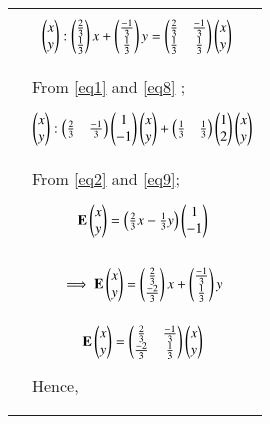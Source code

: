 \documentclass[journal,12pt]{IEEEtran}
\begin{document}
\begin{longtable}{|p{4cm}|p{14cm}|}
      &{\begin{align}\label{eq8}
      & \begin{pmatrix}x\\y\end{pmatrix}: \begin{pmatrix}\frac{2}{3}\\\frac{1}{3}\end{pmatrix}x
      +\begin{pmatrix}\frac{-1}{3}\\\frac{1}{3}\end{pmatrix}y = \begin{pmatrix}\frac{2}{3}&\frac{-1}{3}\\\frac{1}{3}&\frac{1}{3}\end{pmatrix}\begin{pmatrix}x\\y\end{pmatrix}
      \end{align}}\\
      &\\
      & From \eqref{eq1} and \eqref{eq8} ; \\
      & {\begin{align} \label{eq9} 
      \begin{pmatrix}x\\y\end{pmatrix} : \begin{pmatrix}\frac{2}{3} &\frac{-1}{3}\end{pmatrix}\begin{pmatrix}1\\-1\end{pmatrix}\begin{pmatrix}x\\y\end{pmatrix}+\begin{pmatrix}\frac{1}{3} &\frac{1}{3}\end{pmatrix}\begin{pmatrix}1\\2\end{pmatrix}\begin{pmatrix}x\\y\end{pmatrix}
      \end{align}}\\
      &\\
      & From \eqref{eq2} and \eqref{eq9};\\ 
      & {\begin{align} \label{eq10} 
      \mathbf{E}\begin{pmatrix}x\\y\end{pmatrix} = \begin{pmatrix}\frac{2}{3}x-\frac{1}{3}y\end{pmatrix} \begin{pmatrix}1\\-1\end{pmatrix}
      \end{align}}\\
      & \\
      &{\begin{align}
     \implies \mathbf{E}\begin{pmatrix}x\\y\end{pmatrix} = \begin{pmatrix}\frac{2}{3}\\\frac{-2}{3}\end{pmatrix}x + \begin{pmatrix}\frac{-1}{3}\\\frac{1}{3}\end{pmatrix}y
     \end{align}}\\
     &{\begin{align}
     \mathbf{E}\begin{pmatrix}x\\y\end{pmatrix} = \begin{pmatrix}\frac{2}{3}&\frac{-1}{3}\\\frac{-2}{3}&\frac{1}{3}\end{pmatrix}\begin{pmatrix}x\\y\end{pmatrix}
      \end{align}}\\
     & Hence,\\
      &{\begin{align}

\end{align}}
\end{longtable}
\end{document}
